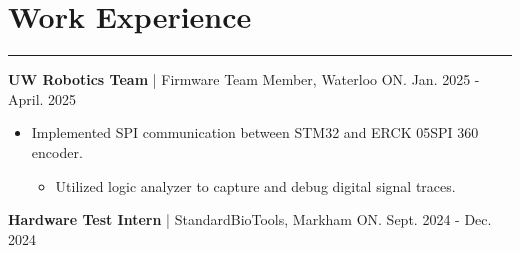 \documentclass{article}
\begin{document}

\vspace{-0.5cm}     
\section*{\hspace{0.2cm} \large Work Experience}
\begin{center}
    \vspace{-0.5cm}
    \rule{\textwidth}{0.1pt}
\end{center}


\vspace{0cm}
\textbf{\hspace{-0.10cm} UW Robotics Team} | Firmware Team Member, Waterloo ON. \hspace {4.5cm} {\small Jan. 2025 - April. 2025}

\vspace{-0.2cm}
\begin{itemize}[leftmargin=1.5cm]

    \item {Implemented SPI communication between STM32 and ERCK 05SPI 360 encoder.
    \vspace{-0.2cm}
    \begin{itemize} [label=$\circ$, leftmargin=0.5cm]
        \item {Utilized logic analyzer to capture and debug digital signal traces.}
    \end{itemize}
    
    }    
\end{itemize}




\vspace{0cm}
\textbf{\hspace{-0.10cm} Hardware Test Intern} | StandardBioTools, Markham ON. \hspace {5.2cm} {\small Sept. 2024 - Dec. 2024}
\end{document}
